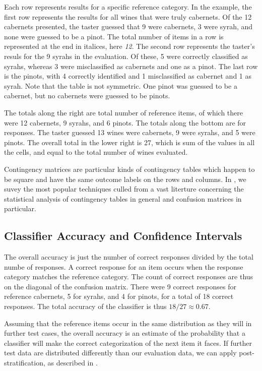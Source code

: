 %
Each row represents results for a specific reference category.  In the
example, the first row represents the results for all wines that were
truly cabernets.  Of the 12 cabernets presented, the taster guessed
that 9 were cabernets, 3 were syrah, and none were guessed to be a
pinot.  The total number of items in a row is represented at the end
in italices, here {\it 12}.  The second row represents the taster's
resuls for the 9 syrahs in the evaluation.  Of these, 5 were correctly
classified as syrahs, whereas 3 were misclassified as cabernets and
one as a pinot.  The last row is the pinots, with 4 correctly
identified and 1 misclassified as cabernet and 1 as syrah.  Note that
the table is not symmetric.  One pinot was guessed to be a cabernet,
but no cabernets were guessed to be pinots.  

The totals along the right are total number of reference items, of
which there were 12 cabernets, 9 syrahs, and 6 pinots.  The totals
along the bottom are for responses.  The taster guessed 13 wines were
cabernets, 9 were syrahs, and 5 were pinots.  The overall total in the
lower right is 27, which is sum of the values in all the cells, and
equal to the total number of wines evaluated.

Contingency matrices are particular kinds of contingency tables which
happen to be square and have the same outcome labels on the rows and
columns.  In , we
suvey the most popular techniques culled from a vast literture
concerning the statistical analysis of contingency tables in general
and confusion matrices in particular.  

\subsection{Classifier Accuracy and Confidence Intervals}

The overall accuracy is just the number of correct responses divided
by the total numbe of responses.  A correct response for an item
occurs when the response category matches the reference category.  The
count of correct responses are thus on the diagonal of the confusion
matrix.  There were 9 correct responses for reference cabernets, 5 for
syrahs, and 4 for pinots, for a total of 18 correct responses.  The
total accuracy of the classifier is thus $18/27 \approx 0.67$.  

Assuming that the reference items occur in the same distribution as
they will in further test cases, the overall accuracy is an estimate
of the probability that a classifier will make the correct
categorization of the next item it faces.  If further test data are
distributed differently than our evaluation data, we can apply
post-stratification, as described in
.

